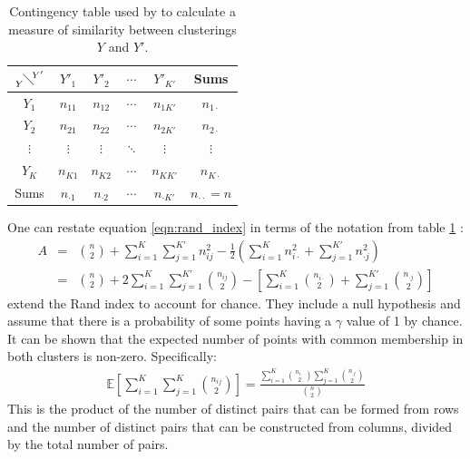 \documentclass[12pt]{article} %
\begin{document}
	\begin{table}[] 
		\centering
		\begin{tabular}{c|cccc|c} 
			$ {{} \atop Y}  \!\diagdown\! ^{Y'}$	& $Y'_1$	& $Y'_2$	& $\cdots$	& $Y'_{K'}$	& Sums	\\ 
			\hline
			$Y_1$		& $n_{11}$	& $n_{12}$	& $\cdots$	& $n_{1K'}$	& $n_{1 \cdot}$	\\
			$Y_2$		& $n_{21}$	& $n_{22}$	& $\cdots$	& $n_{2K'}$	& $n_{2 \cdot}$	\\
			$\vdots$	& $\vdots$	& $\vdots$	& $\ddots$	& $\vdots$	& $\vdots$		 \\
			$Y_{K}$	& $n_{K1}$	& $n_{K2}$	& $\cdots$	& $n_{KK'}$	& $n_{K \cdot}$	\\ 
			\hline
			Sums	& $n_{\cdot 1}$	&  $n_{\cdot 2}$	& $\cdots$	& $n_{\cdot K'}$	& $n_{\cdot \cdot} = n$         
		\end{tabular}
		\caption{Contingency table used by \citet{RandObjectiveCriteriaEvaluation1971} to calculate a measure of similarity between clusterings $Y$ and $Y'$.}
		\label{table:rand_contingency}
	\end{table}
	One can restate equation \ref{eqn:rand_index} in terms of the notation from table \ref{table:rand_contingency} \citep{BrennanMeasuringagreementwhen1974}:
	\begin{eqnarray} \label{eqn:rand_index_alternative}
	A &=& \binom{n}{2} + \sum_{i=1}^K\sum_{j=1}^{K'}n_{ij}^2 - \frac{1}{2}\left(\sum_{i=1}^K n_{i\cdot}^2 + \sum_{j=1}^{K'}n_{\cdot j}^2  \right) \\
	&=& \binom{n}{2} + 2 \sum_{i=1}^{K}\sum_{j=1}^{K'}\binom{n_{ij}}{2} - \left[\sum_{i=1}^{K}\binom{n_{i \cdot}}{2} + \sum_{j=1}^{K'}\binom{n_{\cdot j}}{2}\right]%
	\end{eqnarray}
	\citet{HubertComparingpartitions1985} extend the Rand index to account for chance. They include a null hypothesis and assume that there is a probability of some points having a $\gamma$ value of 1 by chance. It can be shown that the expected number of points with common membership in both clusters is non-zero. Specifically:
	\begin{eqnarray}
	\mathbb{E}\left[\sum_{i=1}^K \sum_{j=1}^K\binom{n_{ij}}{2}\right] = \frac{\sum_{i=1}^K \binom{n_{i\cdot}}{2} \sum_{j=1}^K \binom{n_{\cdot j}}{2}}{\binom{n}{2}}
	\end{eqnarray}
	This is the product of the number of distinct pairs that can be formed from rows and the number of distinct pairs that can be constructed from columns, divided by the total number of pairs. 
	
\end{document}
